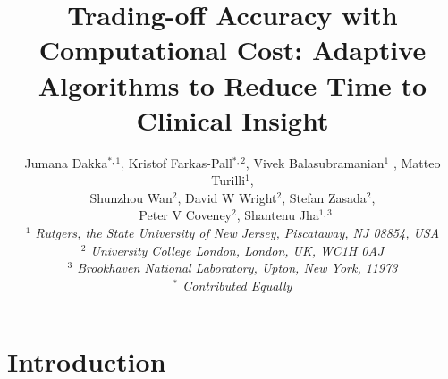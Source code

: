 \documentclass[conference]{IEEEtran}
\begin{document}


\title{Trading-off Accuracy with Computational Cost: Adaptive Algorithms to Reduce Time to Clinical Insight}




\author{Jumana Dakka$^{*,1}$, Kristof Farkas-Pall$^{*,2}$, Vivek Balasubramanian$^{1}$ , Matteo Turilli$^{1}$, \\
 Shunzhou Wan$^{2}$, David W Wright$^{2}$, Stefan Zasada$^{2}$, \\\
 Peter V Coveney$^{2}$, Shantenu Jha$^{1,3}$ \\

  \small{\emph{$^{1}$ Rutgers, the State University of New Jersey, Piscataway, NJ 08854, USA}}\\
   \small{\emph{$^{2}$ University College London, London, UK, WC1H 0AJ}}\\
   \small{\emph{$^{3}$ Brookhaven National Laboratory, Upton, New York, 11973}}\\
   \small{\emph{$^{*}$ Contributed Equally}}
}


\date{}
\maketitle

\begin{abstract}

\end{abstract}


\section{Introduction}\label{sec:intro}
\end{document}
